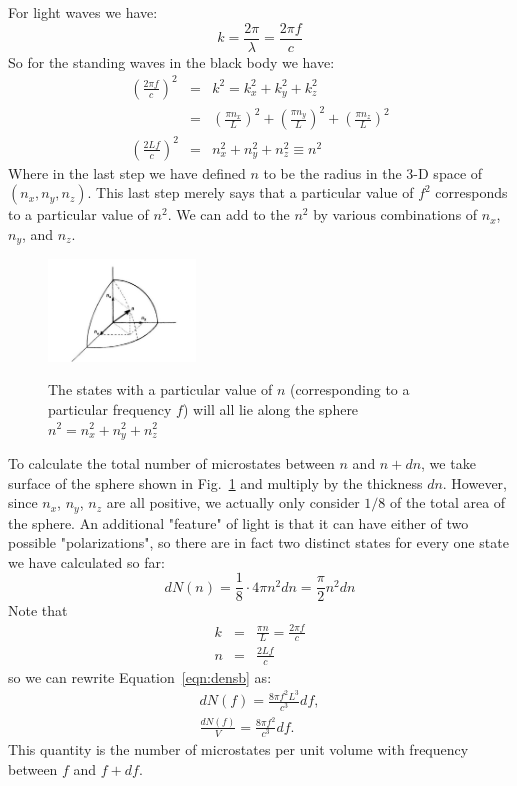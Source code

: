 \documentclass[12pt]{article}
\begin{document}
For light waves we have:
\begin{displaymath}
k = \frac{2 \pi}{\lambda} = \frac{2 \pi f}{c}
\end{displaymath}
So for the standing waves in the black body we have:
\begin{eqnarray}
\left( \frac{2 \pi f}{c} \right)^2 & = &  k^2 = k_x^2 + k_y^2 + k_z^2 \nonumber \\
& = &  \left( \frac{\pi n_x}{L} \right)^2 + \left( \frac{\pi n_y}{L} \right)^2 + \left( \frac{\pi n_z}{L} \right)^2 \nonumber \label{eqn:densa}\\
\left( \frac{2 L f}{c} \right)^2 & = & n_x^2 + n_y^2 + n_z^2 \equiv n^2
\end{eqnarray}
Where in the last step we have defined $n$ to be the radius in the 3-D space of $(n_x, n_y, n_z)$.  This last step merely says that a particular value of $f^2$ corresponds to a particular value of $n^2$.  We can add to the $n^2$ by various combinations of $n_x$, $n_y$, and $n_z$.

\begin{figure}[thb]
\begin{center}
{\includegraphics[width=0.35\textwidth]{figs/nspace.jpg}}
\end{center}
\caption{\label{fig:nspace} The states with a particular value of $n$ (corresponding to a particular frequency $f$) will all lie along the sphere $n^2 = n_x^2 + n_y^2 + n_z^2$ }
\end{figure}

To calculate the total number of microstates between $n$ and $n+dn$, we take surface of the sphere shown in Fig.~\ref{fig:nspace} and multiply by the thickness $dn$.   However, since $n_x$, $n_y$, $n_z$ are all positive, we actually only consider $1/8$ of the total area of the sphere.  An additional "feature" of light is that it can have either of two possible "polarizations", so there are in fact two distinct states for every one state we have calculated so far:
\begin{equation}\label{eqn:densb}
dN(n) = \frac{1}{8} \cdot 4 \pi n^2 dn = \frac{\pi}{2} n^2 dn 
\end{equation}
Note that 
\begin{eqnarray*}
k & = &  \frac{\pi n}{L} = \frac{2 \pi f}{c} \\ 
n & = & \frac{2 L f}{c}
\end{eqnarray*}
so we can rewrite Equation~\ref{eqn:densb} as:
\begin{eqnarray}\label{eqn:densc}
dN(f) = \frac{8 \pi f^2 L^3}{c^3} df, \nonumber \\
\frac{dN(f)}{V} = \frac{8 \pi f^2}{c^3} df. 
\end{eqnarray}
This quantity is the number of microstates per unit volume with frequency between $f$ and $f+df$.
\end{document}
